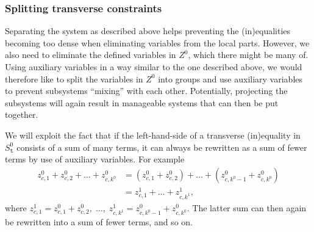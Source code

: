 \subsubsection{Splitting transverse constraints}
Separating the system as described above helps preventing the (in)equalities becoming too dense when eliminating variables from the local parts. However, we also need to eliminate the defined variables in $Z^0$, which there might be many of. Using auxiliary variables in a way similar to the one described above, we would therefore like to split the variables in $Z^0$ into groups and use auxiliary variables to prevent subsystems ``mixing'' with each other. Potentially, projecting the subsystems will again result in manageable systems that can then be put together.

We will exploit the fact that if the left-hand-side of a transverse (in)equality in $S^0_\texttt{t}$ consists of a sum of many terms, it can always be rewritten as a sum of fewer terms by use of auxiliary variables. For example
\begin{align*}
z^0_{c,1} + z^0_{c,2} + \ldots + z^0_{c,k^0} &=
(z^0_{c,1} + z^0_{c,2}) + \ldots + (z^0_{c,k^0-1} + z^0_{c, k^0}) \\
&= z^1_{c,1} + \ldots + z^1_{c,k^1},
\end{align*}
where $z^1_{c,1} = z^0_{c,1} + z^0_{c,2},\; \ldots,\; z^1_{c,k^1}=z^0_{c,k^0-1} + z^0_{c,k^0}$. The latter sum can then again be rewritten into a sum of fewer terms, and so on.

